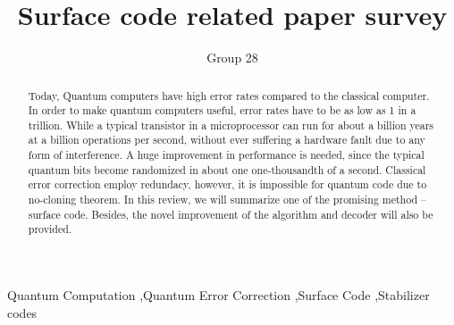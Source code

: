 \documentclass[final,5p,times,twocolumn,authoryear]{elsarticle}
\begin{document}
\begin{frontmatter}

\title{Surface code related paper survey}

\author{Group 28}

\begin{abstract}
Today, Quantum computers have high error rates compared to the classical computer. In order to make quantum computers useful, error rates have to be as low as 1 in a trillion. While a typical transistor in a microprocessor can run for about a billion years at a billion operations per second, without ever suffering a hardware fault due to any form of interference. A huge improvement in performance is needed, since the typical quantum bits become randomized in about one one-thousandth of a second. Classical error correction employ redundacy, however, it is impossible for quantum code due to no-cloning theorem. In this review, we will summarize one of the promising method – surface code. Besides, the novel improvement of the algorithm and decoder will also be provided.
\end{abstract}



\begin{keyword}
Quantum Computation \sep Quantum Error Correction \sep Surface Code \sep Stabilizer codes



\end{keyword}


\end{frontmatter}



\end{document}
